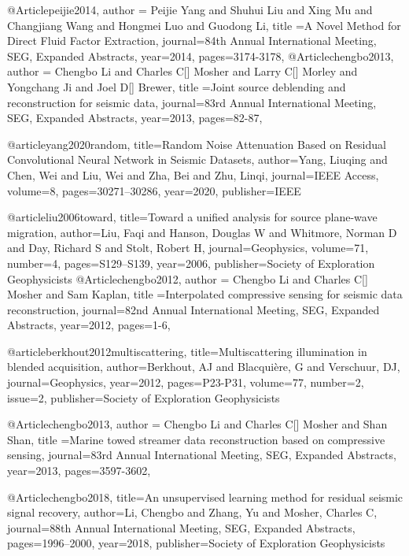 @Article{peijie2014,
  author = {Peijie Yang and Shuhui Liu and Xing Mu and Changjiang Wang and Hongmei Luo and Guodong Li},
  title ={A Novel Method for Direct Fluid Factor Extraction},
  journal={84th Annual International Meeting, SEG, Expanded Abstracts},
  year=2014,
  pages={3174-3178},
}
@Article{chengbo2013,
  author = {Chengbo Li and Charles C[] Mosher and Larry C[] Morley and Yongchang Ji and Joel D[] Brewer},
  title ={Joint source deblending and reconstruction for seismic data},
  journal={83rd Annual International Meeting, SEG, Expanded Abstracts},
  year=2013,
  pages={82-87},
}

@article{yang2020random,
  title={Random Noise Attenuation Based on Residual Convolutional Neural Network in Seismic Datasets},
  author={Yang, Liuqing and Chen, Wei and Liu, Wei and Zha, Bei and Zhu, Linqi},
  journal={IEEE Access},
  volume={8},
  pages={30271--30286},
  year={2020},
  publisher={IEEE}
}

@article{liu2006toward,
  title={Toward a unified analysis for source plane-wave migration},
  author={Liu, Faqi and Hanson, Douglas W and Whitmore, Norman D and Day, Richard S and Stolt, Robert H},
  journal={Geophysics},
  volume={71},
  number={4},
  pages={S129--S139},
  year={2006},
  publisher={Society of Exploration Geophysicists}
}
@Article{chengbo2012,
  author = {Chengbo Li and Charles C[] Mosher and Sam Kaplan},
  title ={Interpolated compressive sensing for seismic data reconstruction},
  journal={82nd Annual International Meeting, SEG, Expanded Abstracts},
  year=2012,
  pages={1-6},
}

@article{berkhout2012multiscattering,
  title={Multiscattering illumination in blended acquisition},
  author={Berkhout, AJ and Blacqui{\`e}re, G and Verschuur, DJ},
  journal={Geophysics},
  year={2012},
  pages={P23-P31},
  volume=77,
  number=2,
  issue=2,
  publisher={Society of Exploration Geophysicists}
}

@Article{chengbo2013,
  author = {Chengbo Li and Charles C[] Mosher and Shan Shan},
  title ={Marine towed streamer data reconstruction based on compressive sensing},
  journal={83rd Annual International Meeting, SEG, Expanded Abstracts},
  year=2013,
  pages={3597-3602},
}

@Article{chengbo2018,
  title={An unsupervised learning method for residual seismic signal recovery},
  author={Li, Chengbo and Zhang, Yu and Mosher, Charles C},
  journal={88th Annual International Meeting, SEG, Expanded Abstracts},
  pages={1996--2000},
  year={2018},
  publisher={Society of Exploration Geophysicists}
}

